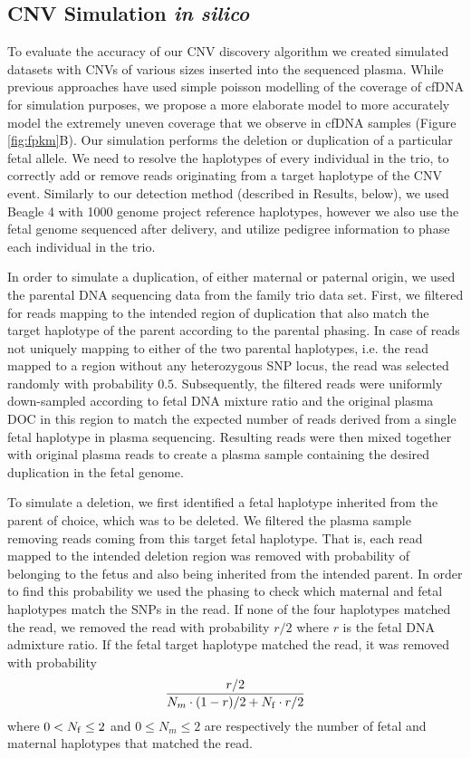 \subsection{CNV Simulation \emph{in silico}}\label{ss:simulation}
To evaluate the accuracy of our CNV discovery algorithm we created simulated datasets with CNVs of various sizes inserted into the sequenced plasma. While previous approaches have used simple poisson modelling of the coverage of cfDNA \cite{chen2013} for simulation purposes, we propose a more elaborate model to more accurately model the extremely uneven coverage that we observe in cfDNA samples (Figure \ref{fig:fpkm}B). Our simulation performs the deletion or duplication of a particular fetal allele.  We need to resolve the haplotypes of every individual in the trio, to correctly add or remove reads originating from a target haplotype of the CNV event. Similarly to our detection method (described in Results, below), we used Beagle 4 \cite{browning2013} with 1000 genome project reference haplotypes, however we also use the fetal genome sequenced after delivery, and utilize pedigree information to phase each individual in the trio.

	In order to simulate a duplication, of either maternal or paternal origin, we used the parental DNA sequencing data from the family trio data set. First, we filtered for reads mapping to the intended region of duplication that also match the target haplotype of the parent according to the parental phasing. In case of reads not uniquely mapping to either of the two parental haplotypes, i.e. the read mapped to a region without any heterozygous SNP locus, the read was selected randomly with probability $0.5$. Subsequently, the filtered reads were uniformly down-sampled according to fetal DNA mixture ratio and the original plasma DOC in this region to match the expected number of reads derived from a single fetal haplotype in plasma sequencing. Resulting reads were then mixed together with original plasma reads to create a plasma sample containing the desired duplication in the fetal genome.
	
	To simulate a deletion, we first identified a fetal haplotype inherited from the parent of choice, which was to be deleted. We filtered the plasma sample removing reads coming from this target fetal haplotype. That is, each read mapped to the intended deletion region was removed with probability of belonging to the fetus and also being inherited from the intended parent. In order to find this probability we used the phasing to check which maternal and fetal haplotypes match the SNPs in the read. If none of the four haplotypes matched the read, we removed the read with probability $r/2$ where $r$ is the fetal DNA admixture ratio. If the fetal target haplotype matched the read, it was removed with probability
\begin{align}
\frac{ r/2 } { N_m \cdot (1-r)/2 + N_{\mathrm{f}} \cdot r/2}
\end{align}
where $0 < N_{\mathrm{f}} \leq 2$ and $0 \leq N_m \leq 2$ are respectively the number of fetal and maternal haplotypes that matched the read.
	
